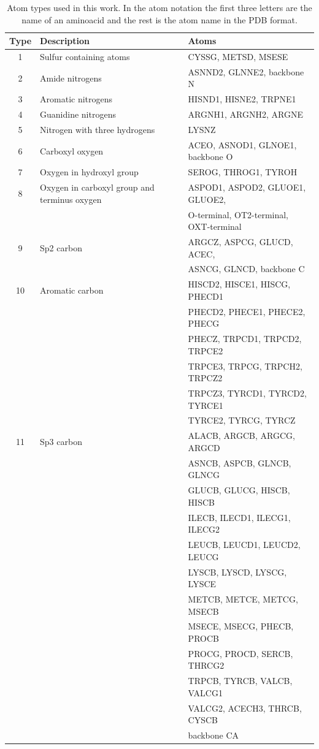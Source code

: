 \documentclass[a4paper,10pt]{article}
\begin{document}
\begin{table}[H]
\begin{center}
\begin{tabular}{ c | l | l }
    
    Type & Description & Atoms \\
    \hline
    1 & Sulfur containing atoms & CYSSG, METSD, MSESE \\ \hline
    2 & Amide nitrogens & ASNND2, GLNNE2, backbone N \\ \hline
    3 & Aromatic nitrogens & HISND1, HISNE2, TRPNE1 \\ \hline
    4 & Guanidine nitrogens & ARGNH1, ARGNH2, ARGNE \\ \hline
    5 & Nitrogen with three hydrogens & LYSNZ \\ \hline
    6 & Carboxyl oxygen & ACEO, ASNOD1, GLNOE1, backbone O \\ \hline
    7 & Oxygen in hydroxyl group & SEROG, THROG1, TYROH \\ \hline
    8 & Oxygen in carboxyl group and terminus oxygen & ASPOD1, ASPOD2, GLUOE1, GLUOE2, \\
     & &  O-terminal, OT2-terminal, OXT-terminal \\ \hline
    9 & Sp2 carbon & ARGCZ, ASPCG, GLUCD, ACEC, \\
     & & ASNCG, GLNCD, backbone C \\ \hline
    10 & Aromatic carbon & HISCD2, HISCE1, HISCG, PHECD1 \\
     & & PHECD2, PHECE1, PHECE2, PHECG \\ 
     & & PHECZ, TRPCD1, TRPCD2, TRPCE2 \\
     & & TRPCE3, TRPCG, TRPCH2, TRPCZ2 \\
     & & TRPCZ3, TYRCD1, TYRCD2, TYRCE1 \\
     & & TYRCE2, TYRCG, TYRCZ \\ \hline
    11 & Sp3 carbon & ALACB, ARGCB, ARGCG, ARGCD \\
     & & ASNCB, ASPCB, GLNCB, GLNCG \\
     & & GLUCB, GLUCG, HISCB, HISCB \\
     & & ILECB, ILECD1, ILECG1, ILECG2 \\
     & & LEUCB, LEUCD1, LEUCD2, LEUCG \\
     & & LYSCB, LYSCD, LYSCG, LYSCE \\
     & & METCB, METCE, METCG, MSECB \\
     & & MSECE, MSECG, PHECB, PROCB \\
     & & PROCG, PROCD, SERCB, THRCG2 \\
     & & TRPCB, TYRCB, VALCB, VALCG1 \\
     & & VALCG2, ACECH3, THRCB, CYSCB \\
     & & backbone CA \\ \hline
    
\end{tabular}
    
    \caption {Atom types used in this work. In the atom notation the first three letters are the name of an aminoacid and the rest is 
    the atom name in the PDB format.}
    \label{Tbl:atomTypes}
\end{center}
\end{table}
\end{document}
